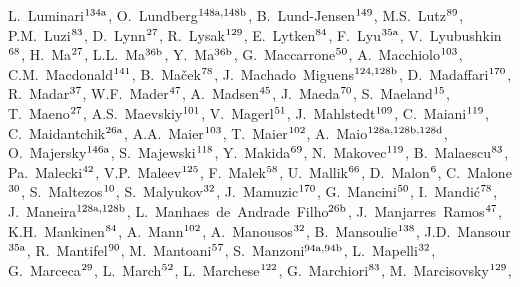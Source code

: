 \begin{flushleft}
L.~Luminari$^\textrm{\scriptsize 134a}$,
O.~Lundberg$^\textrm{\scriptsize 148a,148b}$,
B.~Lund-Jensen$^\textrm{\scriptsize 149}$,
M.S.~Lutz$^\textrm{\scriptsize 89}$,
P.M.~Luzi$^\textrm{\scriptsize 83}$,
D.~Lynn$^\textrm{\scriptsize 27}$,
R.~Lysak$^\textrm{\scriptsize 129}$,
E.~Lytken$^\textrm{\scriptsize 84}$,
F.~Lyu$^\textrm{\scriptsize 35a}$,
V.~Lyubushkin$^\textrm{\scriptsize 68}$,
H.~Ma$^\textrm{\scriptsize 27}$,
L.L.~Ma$^\textrm{\scriptsize 36b}$,
Y.~Ma$^\textrm{\scriptsize 36b}$,
G.~Maccarrone$^\textrm{\scriptsize 50}$,
A.~Macchiolo$^\textrm{\scriptsize 103}$,
C.M.~Macdonald$^\textrm{\scriptsize 141}$,
B.~Ma\v{c}ek$^\textrm{\scriptsize 78}$,
J.~Machado~Miguens$^\textrm{\scriptsize 124,128b}$,
D.~Madaffari$^\textrm{\scriptsize 170}$,
R.~Madar$^\textrm{\scriptsize 37}$,
W.F.~Mader$^\textrm{\scriptsize 47}$,
A.~Madsen$^\textrm{\scriptsize 45}$,
J.~Maeda$^\textrm{\scriptsize 70}$,
S.~Maeland$^\textrm{\scriptsize 15}$,
T.~Maeno$^\textrm{\scriptsize 27}$,
A.S.~Maevskiy$^\textrm{\scriptsize 101}$,
V.~Magerl$^\textrm{\scriptsize 51}$,
J.~Mahlstedt$^\textrm{\scriptsize 109}$,
C.~Maiani$^\textrm{\scriptsize 119}$,
C.~Maidantchik$^\textrm{\scriptsize 26a}$,
A.A.~Maier$^\textrm{\scriptsize 103}$,
T.~Maier$^\textrm{\scriptsize 102}$,
A.~Maio$^\textrm{\scriptsize 128a,128b,128d}$,
O.~Majersky$^\textrm{\scriptsize 146a}$,
S.~Majewski$^\textrm{\scriptsize 118}$,
Y.~Makida$^\textrm{\scriptsize 69}$,
N.~Makovec$^\textrm{\scriptsize 119}$,
B.~Malaescu$^\textrm{\scriptsize 83}$,
Pa.~Malecki$^\textrm{\scriptsize 42}$,
V.P.~Maleev$^\textrm{\scriptsize 125}$,
F.~Malek$^\textrm{\scriptsize 58}$,
U.~Mallik$^\textrm{\scriptsize 66}$,
D.~Malon$^\textrm{\scriptsize 6}$,
C.~Malone$^\textrm{\scriptsize 30}$,
S.~Maltezos$^\textrm{\scriptsize 10}$,
S.~Malyukov$^\textrm{\scriptsize 32}$,
J.~Mamuzic$^\textrm{\scriptsize 170}$,
G.~Mancini$^\textrm{\scriptsize 50}$,
I.~Mandi\'{c}$^\textrm{\scriptsize 78}$,
J.~Maneira$^\textrm{\scriptsize 128a,128b}$,
L.~Manhaes~de~Andrade~Filho$^\textrm{\scriptsize 26b}$,
J.~Manjarres~Ramos$^\textrm{\scriptsize 47}$,
K.H.~Mankinen$^\textrm{\scriptsize 84}$,
A.~Mann$^\textrm{\scriptsize 102}$,
A.~Manousos$^\textrm{\scriptsize 32}$,
B.~Mansoulie$^\textrm{\scriptsize 138}$,
J.D.~Mansour$^\textrm{\scriptsize 35a}$,
R.~Mantifel$^\textrm{\scriptsize 90}$,
M.~Mantoani$^\textrm{\scriptsize 57}$,
S.~Manzoni$^\textrm{\scriptsize 94a,94b}$,
L.~Mapelli$^\textrm{\scriptsize 32}$,
G.~Marceca$^\textrm{\scriptsize 29}$,
L.~March$^\textrm{\scriptsize 52}$,
L.~Marchese$^\textrm{\scriptsize 122}$,
G.~Marchiori$^\textrm{\scriptsize 83}$,
M.~Marcisovsky$^\textrm{\scriptsize 129}$,

\end{flushleft}
